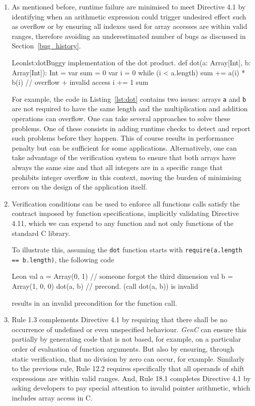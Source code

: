 \documentclass[a4paper,twoside]{article}
\newcommand{\InlineS}[1]{\lstinline[language=Leon]|#1|}
\newcommand{\GenC}{\emph{GenC}\xspace}
\newcommand{\RefSec}[1]{Section~\ref{#1}}
\newcommand{\RefCode}[1]{Listing~\ref{#1}}
\begin{document}
\begin{enumerate}

\item As mentioned before, runtime failure are minimised to meet Directive 4.1
by identifying when an arithmetic expression could trigger undesired effect
such as overflow or by ensuring all indexes used for array accesses are within
valid ranges, therefore avoiding an underestimated number of bugs as discussed
in \RefSec{bug_history}.

\begin{Code}{Leon}{lst:dot}{Buggy implementation of the dot product.}
def dot(a: Array[Int], b: Array[Int]): Int = {
  var sum = 0
  var i = 0
  while (i < a.length) {
    sum += a(i) * b(i) // overflow + invalid access
    i += 1
  }
  sum
}
\end{Code}

For example, the code in \RefCode{lst:dot} contains two issues: arrays
\InlineS{a} and \InlineS{b} are not required to have the same length and the
multiplication and addition operations can overflow. One can take several
approaches to solve these problems. One of these consists in adding runtime
checks to detect and report such problems before they happen. This of course
results in performance penalty but can be sufficient for some applications.
Alternatively, one can take advantage of the verification system to ensure that
both arrays have always the same size and that all integers are in a specific
range that prohibits integer overflow in this context, moving the burden of
minimising errors on the design of the application itself.

\item Verification conditions can be used to enforce all functions calls satisfy
the contract imposed by function specifications, implicitly validating Directive
4.11, which we can expend to any function and not only functions of the standard
C library.

To illustrate this, assuming the \InlineS{dot} function starts with
\InlineS{require(a.length == b.length)}, the following code
\begin{ShortCode}{Leon}
val a = Array(0, 1)    // someone forgot the third dimension
val b = Array(1, 0, 0)
dot(a, b)              // precond. (call dot(a, b)) is invalid
\end{ShortCode}
results in an invalid precondition for the function call.

\item Rule 1.3 complements Directive 4.1 by requiring that there shall be no
occurrence of undefined or even unspecified behaviour. \GenC can ensure this
partially by generating code that is not based, for example, on a particular
order of evaluation of function arguments. But also by ensuring, through static
verification, that no division by zero can occur, for example. Similarly to the
previous rule, Rule 12.2 requires specifically that all operands of shift
expressions are within valid ranges. And, Rule 18.1 completes Directive 4.1 by
asking developers to pay special attention to invalid pointer arithmetic, which
includes array access in C.


\end{enumerate}
\end{document}
